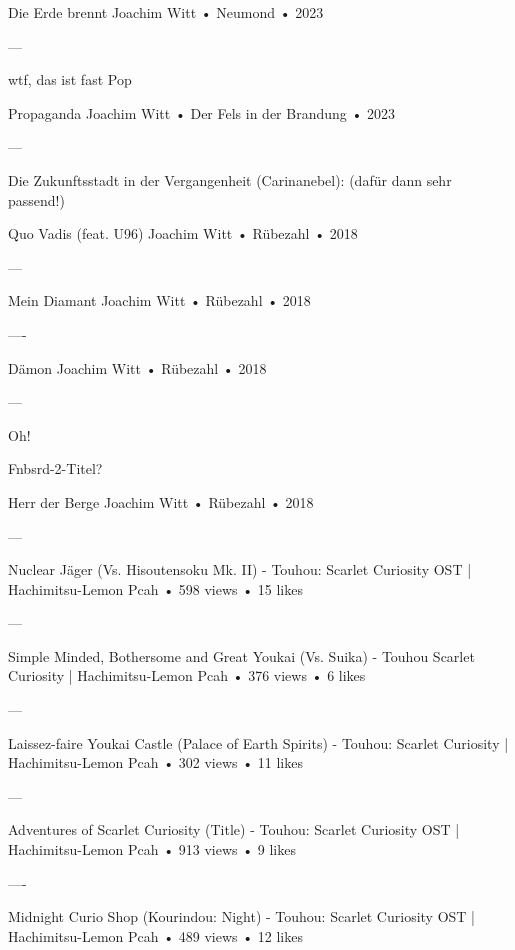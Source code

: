 Die Erde brennt
Joachim Witt
 •
Neumond
 •
2023


—

wtf, das ist fast Pop

Propaganda
Joachim Witt
 •
Der Fels in der Brandung
 •
2023



—

Die Zukunftsstadt in der Vergangenheit (Carinanebel):
(dafür dann sehr passend!)

Quo Vadis (feat. U96)
Joachim Witt
 •
Rübezahl
 •
2018




—



Mein Diamant
Joachim Witt
 •
Rübezahl
 •
2018





—-

Dämon
Joachim Witt
 •
Rübezahl
 •
2018





—

Oh!

Fnbsrd-2-Titel?

Herr der Berge
Joachim Witt
 •
Rübezahl
 •
2018




—


Nuclear Jäger (Vs. Hisoutensoku Mk. II) - Touhou: Scarlet Curiosity OST | Hachimitsu-Lemon
Pcah
 •
598 views
 •
15 likes



—


Simple Minded, Bothersome and Great Youkai (Vs. Suika) - Touhou Scarlet Curiosity | Hachimitsu-Lemon
Pcah
 •
376 views
 •
6 likes




—




Laissez-faire Youkai Castle (Palace of Earth Spirits) - Touhou: Scarlet Curiosity | Hachimitsu-Lemon
Pcah
 •
302 views
 •
11 likes


—


Adventures of Scarlet Curiosity (Title) - Touhou: Scarlet Curiosity OST | Hachimitsu-Lemon
Pcah
 •
913 views
 •
9 likes




—-


Midnight Curio Shop (Kourindou: Night) - Touhou: Scarlet Curiosity OST | Hachimitsu-Lemon
Pcah
 •
489 views
 •
12 likes


